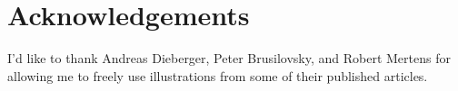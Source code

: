 \chapter{Acknowledgements}
I'd like to thank
Andreas Dieberger,
Peter Brusilovsky, and
Robert Mer\-t\-ens
for allowing me to freely use illustrations from
some of their published articles.
